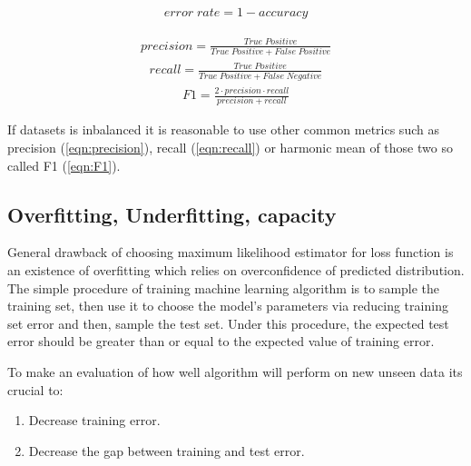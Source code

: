 \documentclass[12pt]{article}
\theoremstyle{definition}
\DeclareRobustCommand{\[}{\begin{equation}}
\DeclareRobustCommand{\]}{\end{equation}}
\begin{document}
        \begin{equation}
                \begin{align}
                   error\;rate = 1 - accuracy 
                \end{align}     
                \label{eqn:error-rate}
        \end{equation}
        
        
        \begin{equation}
            \begin{align}
               precision = \frac{True\;Positive}{True\;Positive + False\;Positive}
            \end{align}     
            \label{eqn:precision}
        \end{equation}
        \begin{equation}
            \begin{align}
               recall = \frac{True\;Positive}{True\;Positive + False\;Negative}
            \end{align}     
            \label{eqn:recall}
        \end{equation}
        \begin{equation}
                \begin{align}
                   F1 = \frac{2 \cdot precision\cdot recall}{precision + recall}
                \end{align}     
                \label{eqn:F1}
        \end{equation}
        
        If datasets is inbalanced it is reasonable to use other common metrics such as precision (\ref{eqn:precision}), recall (\ref{eqn:recall}) or harmonic mean of those two so called F1 (\ref{eqn:F1}).
        
    \subsection{Overfitting, Underfitting, capacity}
        General drawback of choosing maximum likelihood estimator for loss function is an existence of overfitting which relies on overconfidence of predicted distribution. The simple procedure of training machine learning algorithm is to sample the training set, then use it to choose the model's parameters via reducing training set error and then, sample the test set. Under this procedure, the expected test error should be greater than or equal to
        the expected value of training error. \par
        To make an evaluation of how well algorithm will perform on new unseen data its crucial to:
        \begin{enumerate}
            \item Decrease training error.
            \item Decrease the gap between training and test error.
        \end{enumerate}
\end{document}
